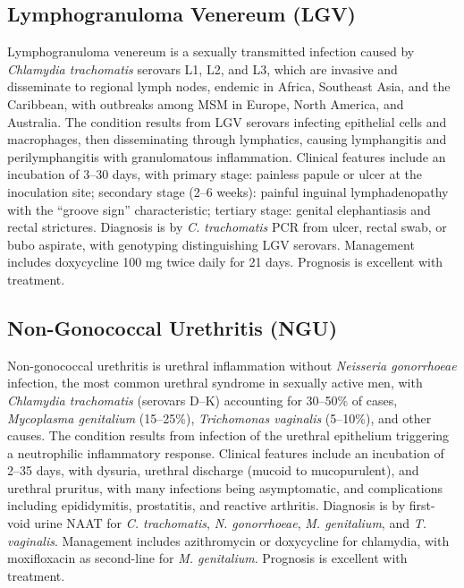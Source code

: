 \subsection{Lymphogranuloma Venereum (LGV)}
\label{sec:Lymphogranuloma Venereum}
Lymphogranuloma venereum is a sexually transmitted infection caused by \textit{Chlamydia trachomatis} serovars L1, L2, and L3, which are invasive and disseminate to regional lymph nodes, endemic in Africa, Southeast Asia, and the Caribbean, with outbreaks among MSM in Europe, North America, and Australia. The condition results from LGV serovars infecting epithelial cells and macrophages, then disseminating through lymphatics, causing lymphangitis and perilymphangitis with granulomatous inflammation. Clinical features include an incubation of 3--30 days, with primary stage: painless papule or ulcer at the inoculation site; secondary stage (2--6 weeks): painful inguinal lymphadenopathy with the ``groove sign'' characteristic; tertiary stage: genital elephantiasis and rectal strictures. Diagnosis is by \textit{C. trachomatis} PCR from ulcer, rectal swab, or bubo aspirate, with genotyping distinguishing LGV serovars. Management includes doxycycline 100 mg twice daily for 21 days. Prognosis is excellent with treatment.

\subsection{Non-Gonococcal Urethritis (NGU)}
\label{sec:Non-Gonococcal Urethritis}
Non-gonococcal urethritis is urethral inflammation without \textit{Neisseria gonorrhoeae} infection, the most common urethral syndrome in sexually active men, with \textit{Chlamydia trachomatis} (serovars D--K) accounting for 30--50\% of cases, \textit{Mycoplasma genitalium} (15--25\%), \textit{Trichomonas vaginalis} (5--10\%), and other causes. The condition results from infection of the urethral epithelium triggering a neutrophilic inflammatory response. Clinical features include an incubation of 2--35 days, with dysuria, urethral discharge (mucoid to mucopurulent), and urethral pruritus, with many infections being asymptomatic, and complications including epididymitis, prostatitis, and reactive arthritis. Diagnosis is by first-void urine NAAT for \textit{C. trachomatis}, \textit{N. gonorrhoeae}, \textit{M. genitalium}, and \textit{T. vaginalis}. Management includes azithromycin or doxycycline for chlamydia, with moxifloxacin as second-line for \textit{M. genitalium}. Prognosis is excellent with treatment.

